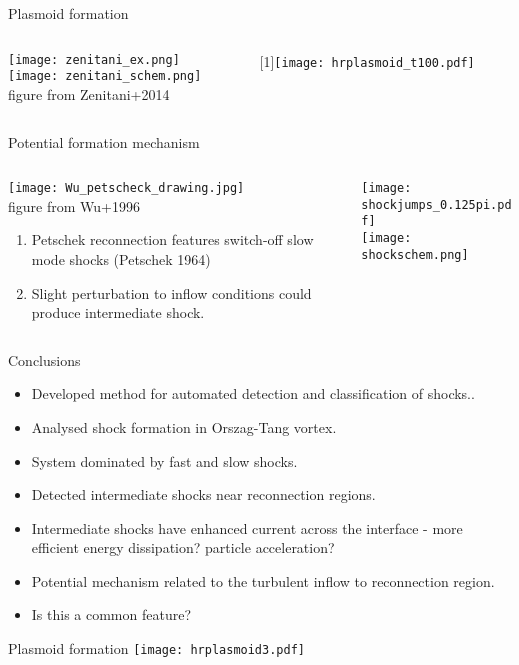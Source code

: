 \documentclass[10pt,aspectratio=169,usenames,dvipsnames]{beamer}
\begin{document}
\begin{frame}{Plasmoid formation}
\begin{columns}
\begin{column}{0.4\textwidth}
\texttt{[image: zenitani\_ex.png]} \\ 
\texttt{[image: zenitani\_schem.png]} \\ {\small figure from Zenitani+2014}
\end{column}
\begin{column}{0.6\textwidth}
\scalebox{-1}[1]{\texttt{[image: hrplasmoid\_t100.pdf]}}
\end{column}
\end{columns}
\end{frame}

\begin{frame}{Potential formation mechanism}
\begin{columns}
\begin{column}{0.5\textwidth}
\texttt{[image: Wu\_petscheck\_drawing.jpg]} \\ {\small figure from Wu+1996}
\begin{enumerate}
\item Petschek reconnection features switch-off slow mode shocks (Petschek 1964)
\item Slight perturbation to inflow conditions could produce intermediate shock.
\end{enumerate}
\end{column}
\begin{column}{0.5\textwidth}
\texttt{[image: shockjumps\_0.125pi.pdf]} \\
\texttt{[image: shockschem.png]}
\end{column}
\end{columns}
\end{frame}

\begin{frame}{Conclusions}
\begin{itemize}
    \item Developed method for automated detection and classification of shocks..
    \item Analysed shock formation in Orszag-Tang vortex.
    \item System dominated by fast and slow shocks.
    \item Detected intermediate shocks near reconnection regions.
    \item Intermediate shocks have enhanced current across the interface - more efficient energy dissipation? particle acceleration?
    \item Potential mechanism related to the turbulent inflow to reconnection region.
    \item Is this a common feature?
\end{itemize}
\end{frame}

\begin{frame}{Plasmoid formation}
\texttt{[image: hrplasmoid3.pdf]}
\end{frame}
\end{document}
